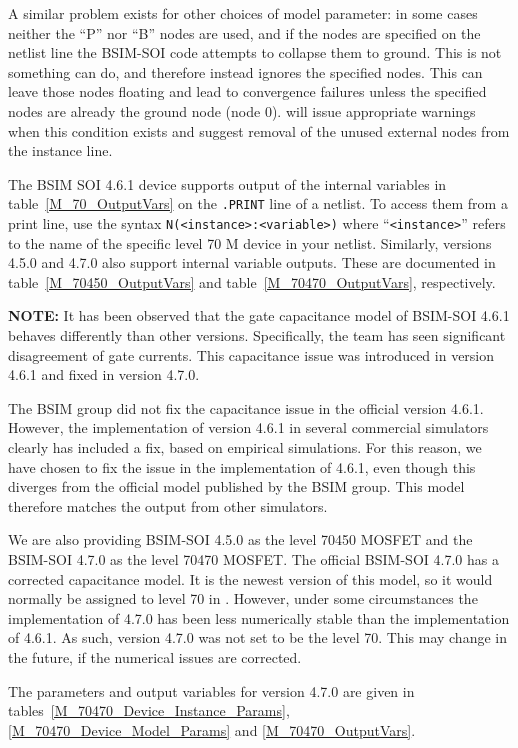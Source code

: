A similar problem exists for other choices of model parameter: in some
cases neither the ``P'' nor ``B'' nodes are used, and if the nodes are
specified on the netlist line the BSIM-SOI code attempts to collapse
them to ground.  This is not something \Xyce{} can do, and therefore
instead \Xyce{} ignores the specified nodes.  This can leave those
nodes floating and lead to convergence failures unless the specified
nodes are already the ground node (node 0).  \Xyce{} will issue
appropriate warnings when this condition exists and suggest removal of
the unused external nodes from the instance line.

The BSIM SOI 4.6.1 device supports output of the internal variables in
table~\ref{M_70_OutputVars} on the \texttt{.PRINT} line of a netlist.
To access them from a print line, use the syntax
\texttt{N(<instance>:<variable>)} where ``\texttt{<instance>}'' refers to the
name of the specific level 70 M device in your netlist.
Similarly, versions 4.5.0 and 4.7.0 also support internal variable outputs.
These are documented in table~\ref{M_70450_OutputVars} and table~\ref{M_70470_OutputVars}, respectively.

\textbf{NOTE:} It has been observed that the gate capacitance model of
BSIM-SOI 4.6.1 behaves differently than other versions. Specifically, the team
has seen significant disagreement of gate currents.  
This capacitance issue was introduced in version 4.6.1 and fixed in version 4.7.0.

The BSIM group did not fix the capacitance issue 
in the official version 4.6.1. However, the implementation of version 4.6.1
in several commercial simulators clearly has included a fix, based on empirical simulations.
For this reason, we have chosen to fix the issue in the \Xyce{} 
implementation of 4.6.1, even though this diverges from the official 
model published by the BSIM group.  
This model therefore matches the output from other simulators.

We are also providing BSIM-SOI 4.5.0 as the level 70450 MOSFET and the BSIM-SOI 4.7.0 as the level 70470 MOSFET.
The official BSIM-SOI 4.7.0 has a corrected capacitance model. 
It is the newest version of this model, so it would normally be assigned to level 70 
in \Xyce{}.
However, under some circumstances the \Xyce{} implementation of 4.7.0 has been 
less numerically stable than the implementation of 4.6.1.   
As such, version 4.7.0 was not set to be the level 70.
This may change in the future, if the numerical issues are corrected.

The parameters and output variables for version 4.7.0 are given in
tables~\ref{M_70470_Device_Instance_Params}, 
\ref{M_70470_Device_Model_Params} and 
\ref{M_70470_OutputVars}.

